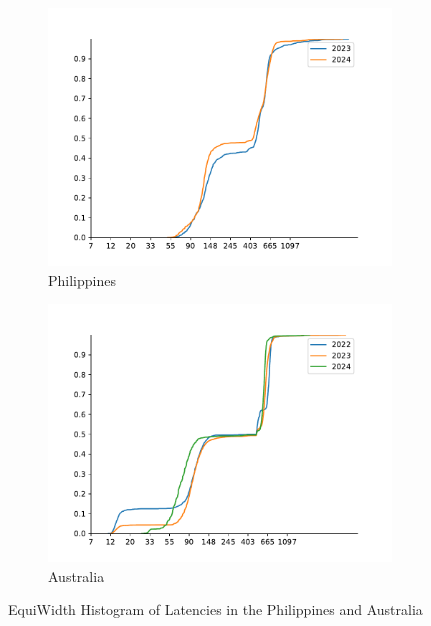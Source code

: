 \begin{figure}
	\centering
	\begin{subfigure}[b]{0.8\linewidth}
		\includegraphics[width=\linewidth]{chapters/4-results/latency/img/cdf_latencies_of_starlink_probes_in_Philippines.pdf}
		\caption{Philippines}
	\end{subfigure}
	\begin{subfigure}[b]{0.8\linewidth}
		\includegraphics[width=\linewidth]{chapters/4-results/latency/img/cdf_latencies_of_starlink_probes_in_australia.pdf}
		\caption{Australia}
	\end{subfigure}
	\caption{EquiWidth Histogram of Latencies in the Philippines and
		Australia}
	\label{fig:latency-cdf-7}
\end{figure}

